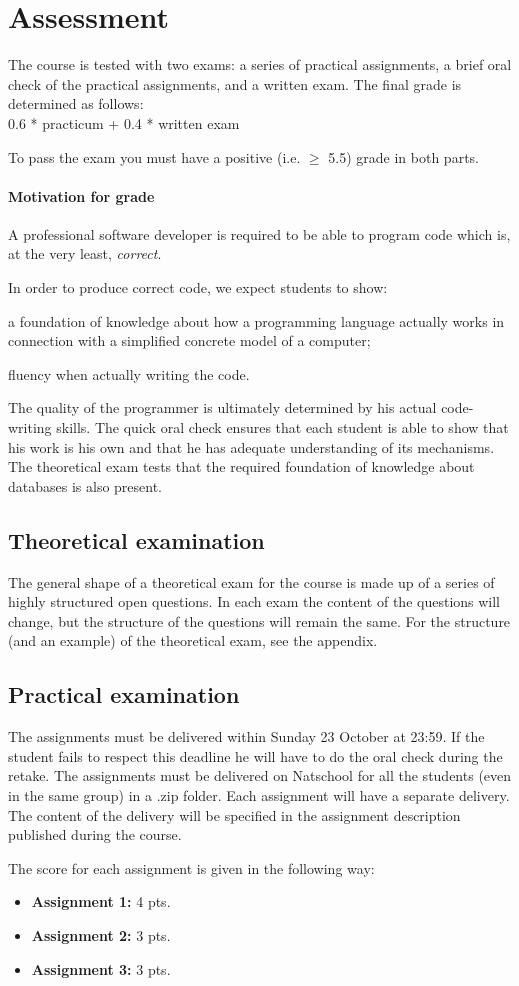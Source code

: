 \section{Assessment}
	The course is tested with two exams: a series of practical assignments, a brief oral check of the practical assignments, and a written exam. The final grade is determined as follows: \\

	0.6 * practicum + 0.4 * written exam

	To pass the exam you must have a positive (i.e. $\geq$ 5.5) grade in both parts.

	\paragraph*{Motivation for grade}
		A professional software developer is required to be able to program code which is, at the very least, \textit{correct}.

		In order to produce correct code, we expect students to show:
		\begin{inparaenum}
			\item a foundation of knowledge about how a programming language actually works in connection with a simplified concrete model of a computer;
			\item fluency when actually writing the code.
		\end{inparaenum}

		The quality of the programmer is ultimately determined by his actual code-writing skills. The quick oral check ensures that each student is able to show that his work is his own and that he has adequate understanding of its mechanisms. The theoretical exam tests that the required foundation of knowledge about databases is also present.


	\subsection{Theoretical examination}
		The general shape of a theoretical exam for the course is made up of a series of highly structured open questions. In each exam the content of the questions will change, but the structure of the questions will remain the same. For the structure (and an example) of the theoretical exam, see the appendix.


	\subsection{Practical examination}
		The assignments must be delivered within Sunday 23 October at 23:59. If the student fails to respect this deadline he will have to do the oral check during the retake. The assignments must be delivered on Natschool for all the students (even in the same group) in a .zip folder. Each assignment will have a separate delivery. The content of the delivery will be specified in the assignment description published during the course.
		
		The score for each assignment is given in the following way:
		\begin{itemize}
		\item \textbf{Assignment 1: } 4 pts.
		\item \textbf{Assignment 2: } 3 pts.
		\item \textbf{Assignment 3: } 3 pts.
		\end{itemize}
